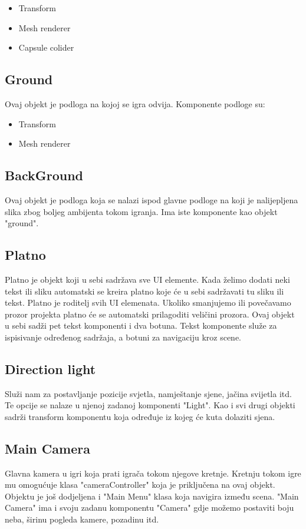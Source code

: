 \begin{itemize}
\item Transform

\item Mesh renderer

\item Capsule colider

\end{itemize}

\subsection{Ground}
Ovaj objekt je podloga na kojoj se igra odvija. Komponente podloge su:

\begin{itemize}
\item Transform

\item Mesh renderer

\end{itemize}
\subsection{BackGround}
Ovaj objekt je podloga koja se nalazi ispod glavne podloge na koji je nalijepljena slika zbog boljeg ambijenta tokom igranja.
Ima iste komponente kao objekt "ground".

\subsection{Platno}
Platno je objekt koji u sebi sadržava sve UI elemente. Kada želimo dodati neki tekst ili sliku automatski se kreira platno koje će u sebi sadržavati tu sliku ili tekst. Platno je roditelj svih UI elemenata. Ukoliko smanjujemo ili povečavamo prozor projekta platno će se automatski prilagoditi veličini prozora. Ovaj objekt u sebi sadži pet tekst komponenti i dva botuna. Tekst komponente služe za ispisivanje određenog sadržaja, a botuni za navigaciju kroz scene.

\subsection{Direction light}
Služi nam za postavljanje pozicije svjetla, namještanje sjene, jačina svijetla itd. Te opcije se nalaze u njenoj zadanoj komponenti "Light". Kao i svi drugi objekti sadrži transform komponentu koja određuje iz kojeg će kuta dolaziti sjena. 

\subsection{Main Camera}
Glavna kamera u igri koja prati igrača tokom njegove kretnje. Kretnju tokom igre mu omogućuje klasa "cameraController" koja je priključena na ovaj objekt. Objektu je još dodjeljena i "Main Menu" klasa koja navigira između scena. "Main Camera" ima i svoju zadanu komponentu "Camera" gdje možemo postaviti boju neba, širinu pogleda kamere, pozadinu itd.



